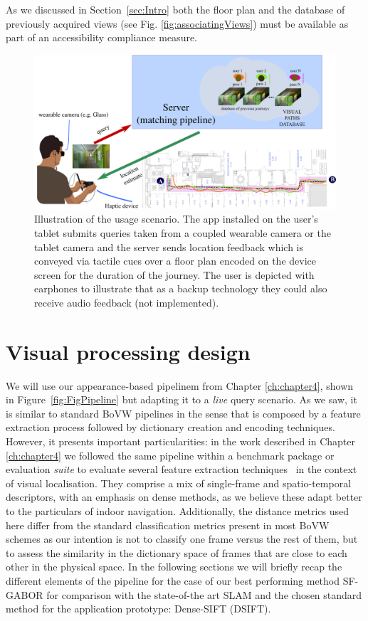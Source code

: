 As we discussed in Section~\ref{sec:Intro} both the floor plan and the database of previously acquired views (see Fig. \ref{fig:associatingViews}) must be available as part of an accessibility compliance measure.


\begin{figure}
\centering
\includegraphics[width=\textwidth]{gfx/Chapter06/overview.png}
\caption{Illustration of the usage scenario. The app installed on the user's tablet submits queries taken from a coupled wearable camera or the tablet camera and the server sends location feedback which is conveyed via tactile cues over a floor plan encoded on the device screen for the duration of the journey. The user is depicted with earphones to illustrate that as a backup technology they could also receive audio feedback (not implemented).}
\label{fig:overview}
\end{figure}

\section{Visual processing design}
\label{sec:visualproc}
We will use our appearance-based pipelinem from Chapter \ref{ch:chapter4}, shown in Figure~\ref{fig:FigPipeline} but adapting it to a \emph{live} query scenario. As we saw, it is similar to standard BoVW pipelines in the sense that is composed by a feature extraction process followed by dictionary creation and encoding techniques. However, it presents important particularities: in the work described in Chapter \ref{ch:chapter4} we followed the same pipeline within a benchmark package or evaluation \emph{suite} to evaluate several feature extraction techniques~\citep{Rivera-Rubio2015PRL} in the context of visual localisation. They comprise a mix of single-frame and spatio-temporal descriptors, with an emphasis on dense methods, as we believe these adapt better to the particulars of indoor navigation. Additionally, the distance metrics used here differ from the standard classification metrics present in most BoVW schemes as our intention is not to classify one frame versus the rest of them, but to assess the similarity in the dictionary space of frames that are close to each other in the physical space. In the following sections we will briefly recap the different elements of the pipeline for the case of our best performing method SF-GABOR for comparison with the state-of-the art SLAM and the chosen standard method for the application prototype: Dense-SIFT (DSIFT).

